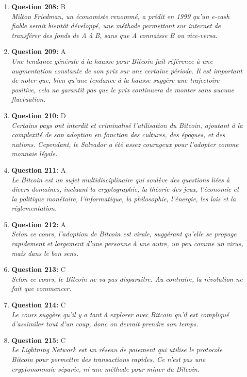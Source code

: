 \documentclass[12pt,a4paper]{article}
\begin{document}
\begin{enumerate}
\item \textbf{Question 208:} B
\\ \textit{Milton Friedman, un économiste renommé, a prédit en 1999 qu'un e-cash fiable serait bientôt développé, une méthode permettant sur internet de transférer des fonds de A à B, sans que A connaisse B ou vice-versa.}

\item \textbf{Question 209:} A
\\ \textit{Une tendance générale à la hausse pour Bitcoin fait référence à une augmentation constante de son prix sur une certaine période. Il est important de noter que, bien qu'une tendance à la hausse suggère une trajectoire positive, cela ne garantit pas que le prix continuera de monter sans aucune fluctuation.}

\item \textbf{Question 210:} D
\\ \textit{Certains pays ont interdit et criminalisé l'utilisation du Bitcoin, ajoutant à la complexité de son adoption en fonction des cultures, des époques, et des nations. Cependant, le Salvador a été assez courageux pour l'adopter comme monnaie légale.}

\item \textbf{Question 211:} A
\\ \textit{Le Bitcoin est un sujet multidisciplinaire qui soulève des questions liées à divers domaines, incluant la cryptographie, la théorie des jeux, l'économie et la politique monétaire, l'informatique, la philosophie, l'énergie, les lois et la réglementation.}

\item \textbf{Question 212:} A
\\ \textit{Selon ce cours, l'adoption de Bitcoin est virale, suggérant qu'elle se propage rapidement et largement d'une personne à une autre, un peu comme un virus, mais dans le bon sens.}

\item \textbf{Question 213:} C
\\ \textit{Selon ce cours, le Bitcoin ne va pas disparaître. Au contraire, la révolution ne fait que commencer.}

\item \textbf{Question 214:} C
\\ \textit{Le cours suggère qu'il y a tant à explorer avec Bitcoin qu'il est compliqué d'assimiler tout d'un coup, donc on devrait prendre son temps.}

\item \textbf{Question 215:} C
\\ \textit{Le Lightning Network est un réseau de paiement qui utilise le protocole Bitcoin pour permettre des transactions rapides. Ce n'est pas une cryptomonnaie séparée, ni une méthode pour miner du Bitcoin.}


\end{enumerate}
\end{document}
